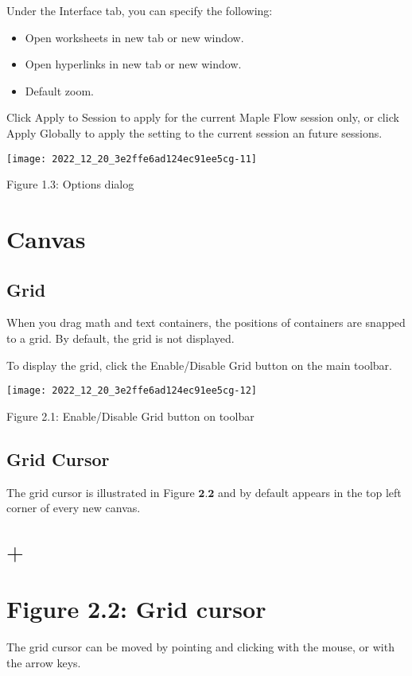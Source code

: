 Under the Interface tab, you can specify the following:

\begin{itemize}
  \item Open worksheets in new tab or new window.

  \item Open hyperlinks in new tab or new window.

  \item Default zoom.

\end{itemize}

Click Apply to Session to apply for the current Maple Flow session only, or click Apply Globally to apply the setting to the current session an future sessions.

\begin{center}
\texttt{[image: 2022\_12\_20\_3e2ffe6ad124ec91ee5cg-11]}
\end{center}

Figure 1.3: Options dialog

\section{Canvas}
\subsection{Grid}
When you drag math and text containers, the positions of containers are snapped to a grid. By default, the grid is not displayed.

To display the grid, click the Enable/Disable Grid button on the main toolbar.

\begin{center}
\texttt{[image: 2022\_12\_20\_3e2ffe6ad124ec91ee5cg-12]}
\end{center}

Figure 2.1: Enable/Disable Grid button on toolbar

\subsection{Grid Cursor}
The grid cursor is illustrated in Figure $\mathbf{2 . 2}$ and by default appears in the top left corner of every new canvas.

\section{$+$}
\section{Figure 2.2: Grid cursor}
The grid cursor can be moved by pointing and clicking with the mouse, or with the arrow keys.

